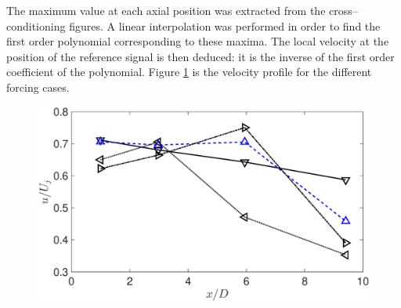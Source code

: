 The maximum value at each axial position was extracted from the cross--conditioning figures. A linear interpolation was performed in order to find the first order polynomial corresponding to these maxima. The local velocity at the position of the reference signal is then deduced: it is the inverse of the first order coefficient of the polynomial. Figure \ref{fig:velocityProfiles} is the velocity profile for the different forcing cases. 

\begin{figure}
	\centering
	\includegraphics[width=1\textwidth]{Figures/conditioning/fluctuationVelocity.eps}
	\label{fig:velocityProfiles}
\end{figure}

